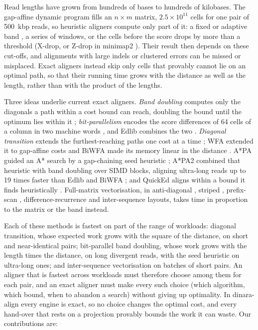 \documentclass[nocrop,noinfo]{bioinfo}
\begin{document}
Read lengths have grown from hundreds of bases to hundreds of kilobases. The gap-affine dynamic program \citep{Gotoh1982} fills an \(n \times m\) matrix, \(2.5 \times 10^{11}\) cells for one pair of 500~kbp reads, so heuristic aligners compute only part of it: a fixed or adaptive band \citep{Liu2023blockaligner}, a series of windows, or the cells before the score drops by more than a threshold (X-drop, or Z-drop in minimap2 \citep{Li2018minimap2}). Their result then depends on these cut-offs, and alignments with large indels or clustered errors can be missed or misplaced. Exact aligners instead skip only cells that provably cannot lie on an optimal path, so that their running time grows with the distance as well as the length, rather than with the product of the lengths.

Three ideas underlie current exact aligners. \emph{Band doubling} computes only the diagonals a path within a cost bound can reach, doubling the bound until the optimum lies within it \citep{Ukkonen1985}; \emph{bit-parallelism} encodes the score differences of 64 cells of a column in two machine words \citep{Myers1999bitvector}, and Edlib combines the two \citep{Sosic2017edlib}. \emph{Diagonal transition} extends the furthest-reaching paths one cost at a time \citep{Ukkonen1985,Myers1986ond}; WFA extended it to gap-affine costs \citep{MarcoSola2021wfa} and BiWFA made its memory linear in the distance \citep{MarcoSola2023biwfa}. A*PA guided an A* search by a gap-chaining seed heuristic \citep{GrootKoerkamp2024astarpa}; A*PA2 combined that heuristic with band doubling over SIMD blocks, aligning ultra-long reads up to 19 times faster than Edlib and BiWFA \citep{GrootKoerkamp2024astarpa2}; and QuickEd aligns within a bound it finds heuristically \citep{Doblas2025quicked}. Full-matrix vectorisation, in anti-diagonal \citep{Wozniak1997}, striped \citep{Farrar2007striped,Zhao2013ssw}, prefix-scan \citep{Daily2016parasail}, difference-recurrence \citep{Suzuki2018diff,Li2018minimap2} and inter-sequence \citep{Rognes2011swipe,Rahn2018seqan} layouts, takes time in proportion to the matrix or the band instead.

Each of these methods is fastest on part of the range of workloads: diagonal transition, whose expected work grows with the square of the distance, on short and near-identical pairs; bit-parallel band doubling, whose work grows with the length times the distance, on long divergent reads, with the seed heuristic on ultra-long ones; and inter-sequence vectorisation on batches of short pairs. An aligner that is fastest across workloads must therefore choose among them for each pair, and an exact aligner must make every such choice (which algorithm, which bound, when to abandon a search) without giving up optimality. In dinara-align every engine is exact, so no choice changes the optimal cost, and every hand-over that rests on a projection provably bounds the work it can waste. Our contributions are:
\end{document}
